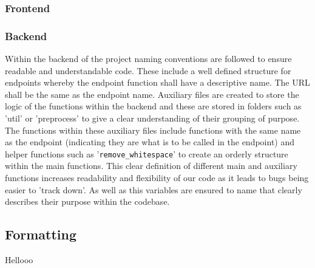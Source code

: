 \documentclass[12pt]{article}
\begin{document}
\subsubsection{Frontend}

\subsubsection{Backend}
Within the backend of the project naming conventions are followed to ensure readable and understandable code. These include a well defined structure for endpoints whereby the endpoint function shall have a descriptive name. The URL shall be the same as the endpoint name. Auxiliary files are created to store the logic of the functions within the backend and these are stored in folders such as 'util' or 'preprocess' to give a clear understanding of their grouping of purpose. The functions within these auxiliary files include functions with the same name as the endpoint (indicating they are what is to be called in the endpoint) and helper functions such as '\texttt{remove\_whitespace}' to create an orderly structure within the main functions. This clear definition of different main and auxiliary functions increases readability and flexibility of our code as it leads to bugs being easier to 'track down'. As well as this variables are ensured to name that clearly describes their purpose within the codebase.

\subsection{Formatting}
Hellooo
\end{document}
